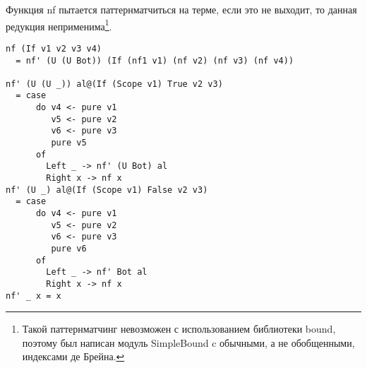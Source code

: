 Функция nf пытается паттернматчиться на терме, если это не выходит, то данная редукция неприменима\footnote{Такой паттернматчинг невозможен с использованием библиотеки bound\cite{bound}, поэтому был написан модуль SimpleBound c обычными, а не обобщенными, индексами де Брейна.}.


\begin{lstlisting}[caption={Приведение в нормальную форму пытается применить все редукции данного функционального символа},captionpos=b, frame=single, float, floatplacement=H]
nf (If v1 v2 v3 v4)
  = nf' (U (U Bot)) (If (nf1 v1) (nf v2) (nf v3) (nf v4))

nf' (U (U _)) al@(If (Scope v1) True v2 v3)
  = case
      do v4 <- pure v1
         v5 <- pure v2
         v6 <- pure v3
         pure v5
      of
        Left _ -> nf' (U Bot) al
        Right x -> nf x
nf' (U _) al@(If (Scope v1) False v2 v3)
  = case
      do v4 <- pure v1
         v5 <- pure v2
         v6 <- pure v3
         pure v6
      of
        Left _ -> nf' Bot al
        Right x -> nf x
nf' _ x = x
\end{lstlisting}
